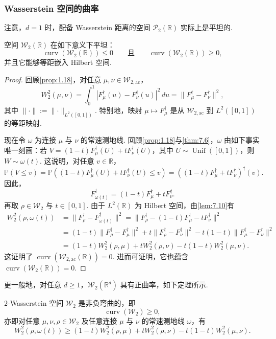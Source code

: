 \subsubsection{Wasserstein 空间的曲率}\label{sec:7.2.2}
注意，$d=1$ 时，配备 Wasserstein 距离的空间 $\mathcal P_2(\mathbb R)$ 实际上是平坦的.
\begin{proposition}\label{prop:7.14}
空间 $\mathcal W_2(\mathbb R)$ 在如下意义下平坦：
$$\operatorname{curv}(\mathcal W_2(\mathbb R))\le0\qquad\text{且}\qquad\operatorname{curv}(\mathcal W_2(\mathbb R))\ge0,$$
并且它能够等距嵌入 Hilbert 空间.
\end{proposition}
\begin{proof}
回顾\autoref{prop:1.18}，对任意 $\mu,\nu\in\mathcal W_{2,\mathrm{ac}}$，
$$W_2^2(\mu,\nu)=\int_0^1|F_\mu^\dagger(u)-F_\nu^\dagger(u)|^2\,du
=\lVert F_\mu^\dagger-F_\nu^\dagger\rVert^2,$$
其中 $\lVert\cdot\rVert:=\lVert\cdot\rVert_{L^2([0,1])}$. 特别地，映射 $\mu\mapsto F_\mu^\dagger$ 是从 $\mathcal W_{2,\mathrm{ac}}$ 到 $L^2([0,1])$ 的等距映射.

现在令 $\omega$ 为连接 $\mu$ 与 $\nu$ 的常速测地线. 回顾\autoref{prop:1.18}与\autoref{thm:7.6}，$\omega$ 由如下事实唯一刻画：若 $V=(1-t)F_\mu^\dagger(U)+tF_\nu^\dagger(U)$，其中 $U\sim\operatorname{Unif}([0,1])$，则 $W\sim\omega(t)$. 这说明，对任意 $v\in\mathbb R$，
$$\mathbb P(V\le v)=\mathbb P((1-t)F_\mu^\dagger(U)+tF_\nu^\dagger(U)\le v)
=((1-t)F_\mu^\dagger+tF_\nu^\dagger)^\dagger(v).$$
因此，
$$F_{\omega(t)}^\dagger=(1-t)F_\mu^\dagger+tF_\nu^\dagger.$$
再取 $\rho\in\mathcal W_2$ 与 $t\in[0,1]$. 由于 $L^2(\mathbb R)$ 为 Hilbert 空间，由\autoref{lem:7.10}有
$$\begin{aligned}
W_2^2(\rho,\omega(t))
&=\lVert F_\rho^\dagger-F_{\omega(t)}^\dagger\rVert^2
=\lVert F_\rho^\dagger-(1-t)F_\mu^\dagger-tF_\nu^\dagger\rVert^2\\
&=(1-t)\lVert F_\rho^\dagger-F_\mu^\dagger\rVert^2+t\lVert F_\rho^\dagger-F_\nu^\dagger\rVert^2-t(1-t)\lVert F_\mu^\dagger-F_\nu^\dagger\rVert^2\\
&=(1-t)W_2^2(\rho,\mu)+tW_2^2(\rho,\nu)-t(1-t)W_2^2(\mu,\nu).
\end{aligned}$$
这证明了 $\operatorname{curv}(\mathcal W_{2,\mathrm{ac}}(\mathbb R))=0$. 进而可证明，它也蕴含 $\operatorname{curv}(\mathcal W_2(\mathbb R))=0$.
\end{proof}
更一般地，对任意 $d\ge1$，$\mathcal W_2(\mathbb R^d)$ 具有正曲率，如下定理所示.
\begin{theorem}\label{thm:7.15}
$2$-Wasserstein 空间 $\mathcal W_2$ 是非负弯曲的，即
$$\operatorname{curv}(\mathcal W_2)\ge0,$$
亦即对任意 $\mu,\nu,\rho\in\mathcal W_2$ 及任意连接 $\mu$ 与 $\nu$ 的常速测地线 $\omega$，有
$$W_2^2(\rho,\omega(t))\ge(1-t)W_2^2(\rho,\mu)+tW_2^2(\rho,\nu)-t(1-t)W_2^2(\mu,\nu).$$
\end{theorem}
